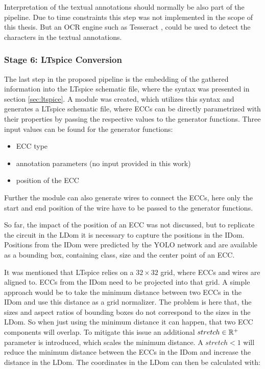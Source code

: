 Interpretation of the textual annotations should normally be also part of the pipeline.
Due to time constraints this step was not implemented in the scope of this thesis.
But an \ac{OCR} engine such as Tesseract \cite{tesseract}, could be used to detect the characters in the textual annotations.

\subsubsection{Stage 6: LTspice Conversion}

The last step in the proposed pipeline is the embedding of the gathered information into the LTspice schematic file, where the syntax was presented in section \ref{sec:ltspice}.
A module was created, which utilizes this syntax and generates a LTspice schematic file, where \acp{ECC} can be directly parametrized with their properties by passing the respective values to the generator functions.
Three input values can be found for the generator functions:
\begin{itemize}
    \item \ac{ECC} type
    \item annotation parameters (no input provided in this work)
    \item position of the \ac{ECC}
\end{itemize}

Further the module can also generate wires to connect the \acp{ECC}, here only the start and end position of the wire have to be passed to the generator functions.

So far, the impact of the position of an \ac{ECC} was not discussed, but to replicate the circuit in the \ac{LDom} it is necessary to capture the positions in the \ac{IDom}.
Positions from the \ac{IDom} were predicted by the \ac{YOLO} network and are available as a bounding box, containing class, size and the center point of an \ac{ECC}.

It was mentioned that LTspice relies on a $32 \times 32$ grid, where \acp{ECC} and wires are aligned to.
\acp{ECC} from the \ac{IDom} need to be projected into that grid.
A simple approach would be to take the minimum distance between two \acp{ECC} in the \ac{IDom} and use this distance as a grid normalizer.
The problem is here that, the sizes and aspect ratios of bounding boxes do not correspond to the sizes in the \ac{LDom}.
So when just using the minimum distance it can happen, that two \ac{ECC} components will overlap.
To mitigate this issue an additional $stretch \in \mathbb{R}^+$ parameter is introduced, which scales the minimum distance.
A $stretch < 1$ will reduce the minimum distance between the \acp{ECC} in the \ac{IDom} and increase the distance in the \ac{LDom}.
The coordinates in the \ac{LDom} can then be calculated with:

